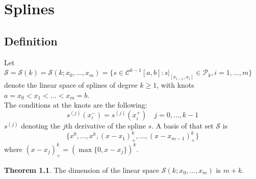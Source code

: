 \documentclass[12pt, openany]{report}
\theoremstyle{definition}
\newtheorem{thm}{Theorem}[chapter]
\begin{document}
\chapter{Splines}
\section{Definition}
Let \(\mathcal{S}=\mathcal{S}(k)=\mathcal{S}(k;x_0,\dots,x_m)=\{s\in \mathcal{C}^{k-1}[a,b]:s|_{[x_{i-1},x_i]}\in \mathcal{P}_k,i=1,\dots,m\}\) denote the linear space of splines of degree \(k\ge 1\), with knots \(a=x_0<x_1<\dots <x_m=b\). \\
The conditions at the knots are the following:
\begin{equation}
    s^{(j)}(x_i^-) = s^{(j)}(x_i^+) \quad j=0,\dots, k-1
\end{equation}
\(s^{(j)}\) denoting the \(j\)th derivative of the spline \(s\).
A basis of that set \(\mathcal{S}\) is 
\begin{equation}
    \{x^0,\dots,x^k, (x-x_1)_+^k,\dots,(x-x_{m-1})^k_+\}
\end{equation}
where \((x-x_j)_+^k = (\max \{0,x-x_j\})^k\). \\
\begin{thm}
    The dimension of the linear space \(\mathcal{S}(k;x_0,\dots,x_m)\) is \(m+k\).
\end{thm}
\end{document}
